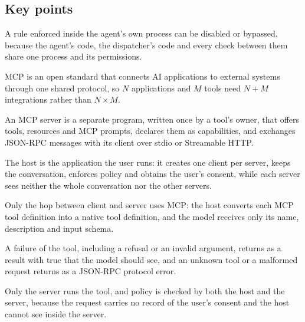 \subsection*{Key points}
\bi
\item A rule enforced inside the agent's own process can be disabled or bypassed, because the
agent's code, the dispatcher's code and every check between them share one process and its
permissions.
\item MCP is an open standard that connects AI applications to external systems through one shared
protocol, so $N$ applications and $M$ tools need $N + M$ integrations rather than $N \times M$.
\item An MCP server is a separate program, written once by a tool's owner, that offers tools,
resources and MCP prompts, declares them as capabilities, and exchanges JSON-RPC messages with its
client over stdio or Streamable HTTP.
\item The host is the application the user runs: it creates one client per server, keeps the
conversation, enforces policy and obtains the user's consent, while each server sees neither the
whole conversation nor the other servers.
\item Only the hop between client and server uses MCP: the host converts each MCP tool definition
into a native tool definition, and the model receives only its name, description and input schema.
\item A failure of the tool, including a refusal or an invalid argument, returns as a result with
 true that the model should see, and an unknown tool or a malformed request returns
as a JSON-RPC protocol error.
\item Only the server runs the tool, and policy is checked by both the host and the server, because
the  request carries no record of the user's consent and the host cannot see
inside the server.
\ei
